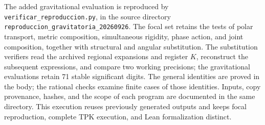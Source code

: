 The added gravitational evaluation is reproduced by
\texttt{verificar\_reproduccion.py}, in the source directory
\texttt{reproduccion\_gravitatoria\_20260926}.
The focal set retains the tests of polar transport, metric composition,
simultaneous rigidity, phase action, and joint composition, together with
structural and angular substitution. The substitution verifiers read the
archived regional expansions and register \(K\), reconstruct the
subsequent expressions, and compare two working precisions; the
gravitational evaluations retain 71 stable significant digits.
The general identities are proved in the body; the rational checks
examine finite cases of those identities. Inputs, copy provenance,
hashes, and the scope of each program are documented in the same
directory. This execution reuses previously generated outputs and
keeps focal reproduction, complete TPK execution, and Lean
formalization distinct.

